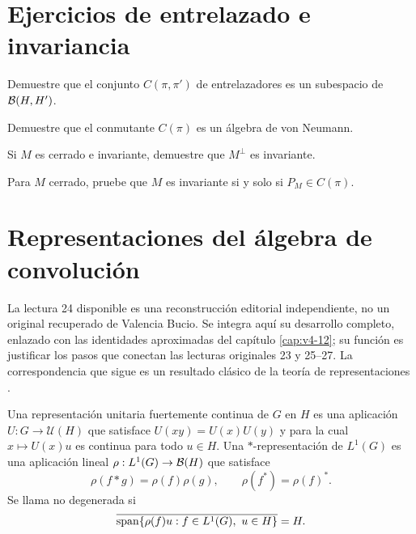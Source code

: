 \section{Ejercicios de entrelazado e invariancia}
\begin{ejercicio}\label{ej:v4-l23-1}
Demuestre que el conjunto $C(\pi,\pi')$ de entrelazadores es un subespacio de $\mathcal B(H,H')$.
\end{ejercicio}

\begin{ejercicio}\label{ej:v4-l23-2}
Demuestre que el conmutante $C(\pi)$ es un álgebra de von Neumann.
\end{ejercicio}

\begin{ejercicio}\label{ej:v4-l23-3}
Si $M$ es cerrado e invariante, demuestre que $M^\perp$ es invariante.
\end{ejercicio}

\begin{ejercicio}\label{ej:v4-l23-4}
Para $M$ cerrado, pruebe que $M$ es invariante si y solo si $P_M\in C(\pi)$.
\end{ejercicio}


\section{Representaciones del álgebra de convolución}\label{lectura:v4-24}
La lectura 24 disponible es una reconstrucción editorial independiente, no un original recuperado de Valencia Bucio. Se integra aquí su desarrollo completo, enlazado con las identidades aproximadas del capítulo \ref{cap:v4-12}; su función es justificar los pasos que conectan las lecturas originales 23 y 25--27. La correspondencia que sigue es un resultado clásico de la teoría de representaciones \cite{reconstruccion24,folland2016}.

\begin{definicion}\label{v4-l24-d:rep}
Una representación unitaria fuertemente continua de $G$ en $H$ es una aplicación $U:G\to\mathcal U(H)$ que satisface $U(xy)=U(x)U(y)$ y para la cual $x\mapsto U(x)u$ es continua para todo $u\in H$. Una $*$-representación de $L^1(G)$ es una aplicación lineal $\rho:L^1(G)\to\mathcal B(H)$ que satisface
\[
\rho(f*g)=\rho(f)\rho(g),\qquad \rho(f^*)=\rho(f)^*.
\]
Se llama no degenerada si
\[
\overline{\operatorname{span}\{\rho(f)u:f\in L^1(G),\ u\in H\}}=H.
\]
\end{definicion}

